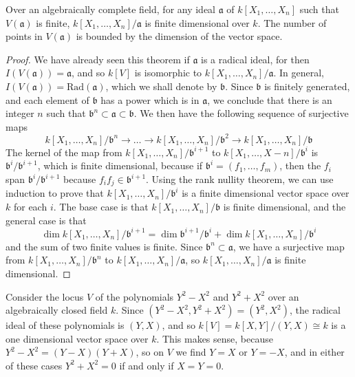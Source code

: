 \begin{lemma}
    Over an algebraically complete field, for any ideal $\mathfrak{a}$ of $k[X_1, \dots, X_n]$ such that $V(\mathfrak{a})$ is finite, $k[X_1, \dots, X_n]/\mathfrak{a}$ is finite dimensional over $k$. The number of points in $V(\mathfrak{a})$ is bounded by the dimension of the vector space.
\end{lemma}
\begin{proof}
    We have already seen this theorem if $\mathfrak{a}$ is a radical ideal, for then $I(V(\mathfrak{a})) = \mathfrak{a}$, and so $k[V]$ is isomorphic to $k[X_1, \dots, X_n]/\mathfrak{a}$. In general, $I(V(\mathfrak{a})) = \text{Rad}(\mathfrak{a})$, which we shall denote by $\mathfrak{b}$. Since $\mathfrak{b}$ is finitely generated, and each element of $\mathfrak{b}$ has a power which is in $\mathfrak{a}$, we conclude that there is an integer $n$ such that $\mathfrak{b}^n \subset \mathfrak{a} \subset \mathfrak{b}$. We then have the following sequence of surjective maps
    \[ k[X_1, \dots, X_n]/\mathfrak{b}^n \to \dots \to k[X_1, \dots, X_n]/\mathfrak{b}^2 \to k[X_1, \dots, X_n]/\mathfrak{b} \]
    The kernel of the map from $k[X_1, \dots, X_n]/\mathfrak{b}^{i+1}$ to $k[X_1, \dots, X-n]/\mathfrak{b}^i$ is $\mathfrak{b}^i/\mathfrak{b}^{i+1}$, which is finite dimensional, because if $\mathfrak{b}^i = (f_1, \dots, f_m)$, then the $f_i$ span $\mathfrak{b}^i/\mathfrak{b}^{i+1}$ because $f_if_j \in \mathfrak{b}^{i+1}$. Using the rank nullity theorem, we can use induction to prove that $k[X_1, \dots, X_n]/\mathfrak{b}^i$ is a finite dimensional vector space over $k$ for each $i$. The base case is that $k[X_1, \dots, X_n]/\mathfrak{b}$ is finite dimensional, and the general case is that
    \[ \dim k[X_1, \dots, X_n]/\mathfrak{b}^{i+1} = \dim \mathfrak{b}^{i+1}/\mathfrak{b}^i + \dim k[X_1, \dots, X_n]/\mathfrak{b}^i \]
    and the sum of two finite values is finite. Since $\mathfrak{b}^n \subset \mathfrak{a}$, we have a surjective map from $k[X_1, \dots, X_n]/\mathfrak{b}^n$ to $k[X_1, \dots, X_n]/\mathfrak{a}$, so $k[X_1, \dots, X_n]/\mathfrak{a}$ is finite dimensional.
\end{proof}

\begin{example}
    Consider the locus $V$ of the polynomials $Y^2 - X^2$ and $Y^2 + X^2$ over an algebraically closed field $k$. Since $(Y^2 - X^2, Y^2 + X^2) = (Y^2,X^2)$, the radical ideal of these polynomials is $(Y,X)$, and so $k[V] = k[X,Y]/(Y,X) \cong k$ is a one dimensional vector space over $k$. This makes sense, because $Y^2 - X^2 = (Y-X)(Y+X)$, so on $V$ we find $Y = X$ or $Y = -X$, and in either of these cases $Y^2 + X^2 = 0$ if and only if $X = Y = 0$.
\end{example}

